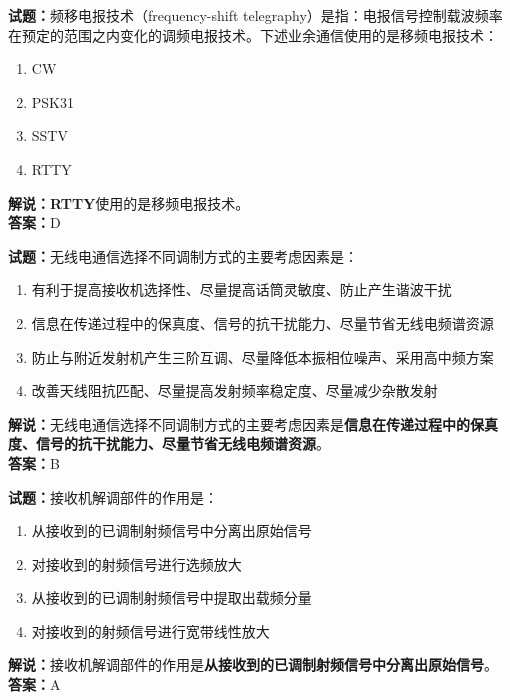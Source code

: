 \documentclass{ctexbook}
\begin{document}

\bigskip


\noindent\textbf{试题：}频移电报技术（frequency-shift telegraphy）是指：电报信号控制载波频率在预定的范围之内变化的调频电报技术。下述业余通信使用的是移频电报技术：
\begin{enumerate}[leftmargin=3em]
\item CW
\item PSK31
\item SSTV
\item RTTY
\end{enumerate}
\noindent\textbf{解说：}\textbf{RTTY}使用的是移频电报技术。\\\noindent\textbf{答案：}D



\bigskip


\noindent\textbf{试题：}无线电通信选择不同调制方式的主要考虑因素是：
\begin{enumerate}[leftmargin=3em]
\item 有利于提高接收机选择性、尽量提高话筒灵敏度、防止产生谐波干扰
\item 信息在传递过程中的保真度、信号的抗干扰能力、尽量节省无线电频谱资源
\item 防止与附近发射机产生三阶互调、尽量降低本振相位噪声、采用高中频方案
\item 改善天线阻抗匹配、尽量提高发射频率稳定度、尽量减少杂散发射
\end{enumerate}
\noindent\textbf{解说：}无线电通信选择不同调制方式的主要考虑因素是\textbf{信息在传递过程中的保真度、信号的抗干扰能力、尽量节省无线电频谱资源}。\\\noindent\textbf{答案：}B



\bigskip


\noindent\textbf{试题：}接收机解调部件的作用是：
\begin{enumerate}[leftmargin=3em]
\item 从接收到的已调制射频信号中分离出原始信号
\item 对接收到的射频信号进行选频放大
\item 从接收到的已调制射频信号中提取出载频分量
\item 对接收到的射频信号进行宽带线性放大
\end{enumerate}
\noindent\textbf{解说：}接收机解调部件的作用是\textbf{从接收到的已调制射频信号中分离出原始信号}。\\\noindent\textbf{答案：}A
\end{document}
